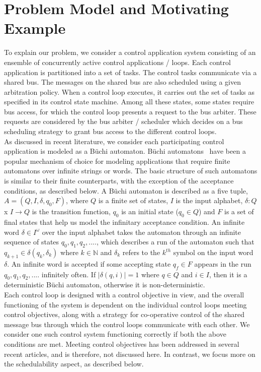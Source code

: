 \section{Problem Model and Motivating Example} \label{sec3}
\noindent
To explain our problem, we consider a control application system consisting of an ensemble of concurrently active control applications / loops. Each control application is partitioned into a set of
tasks. The control tasks communicate via a shared bus. The messages on the shared bus are also scheduled using a given arbitration policy. When a control loop executes, it carries out the set of tasks as specified in its control state machine. Among all these states, some
states require bus access, for which the control loop presents a request to the bus arbiter. These requests are considered by the bus arbiter / scheduler which decides on a bus scheduling strategy to grant bus access to the different control loops. \\

\noindent
As discussed in recent literature, we consider each participating control application is modeled as a B\"{u}chi automaton. B\"{u}chi automatons~\cite{leeuwen90/Thomas90} have been a popular mechanism of choice for modeling applications that require finite automatons over infinite strings or words. The basic structure of such automatons is similar to their finite counterparts, with the exception of the acceptance conditions, as described below.
A B\"{u}chi automaton is described as a five tuple, 
$A = (Q,I,\delta,q_0,F)$, where $Q$ is a finite set of states, $I$ is the input alphabet, $\delta : Q$ x $I \rightarrow Q $ is the transition function, $q_0$ 
is an initial state ($q_0 \in Q$) and $F$ is a set of final states that help us model the infinitary acceptance condition. An infinite word $\delta \in I ^ \omega$ over the input alphabet takes the automaton through an infinite sequence of states $ q_0, q_1, q_2, ....$, which describes a run of
the automaton such that $ q_{k+1} \in \delta(q_k, \delta_k)$ where $k \in \mathbb{N}$ and $\delta_k$ refers to the $k^{th}$ symbol on the input 
word $\delta$. An infinite word is accepted if some 
accepting state $q_f \in F $ appears in the run $ q_0, q_1, q_2, ....$ 
infinitely often. If 
$|\delta(q,i)| = 1$ where $ q \in Q $ and $i \in I$, then it is a deterministic 
B\"{u}chi automaton, otherwise it is non-deterministic. \\

\noindent
Each control loop is designed with a control objective in view, and the overall functioning of the system is dependent on the individual control loops meeting control objectives, along with a strategy for co-operative control of the shared message bus through which the control loops communicate with each other. We consider one such control system functioning correctly if both the above conditions are met. Meeting control objectives has been addressed in several recent articles, and is therefore, not discussed here. In contrast, we focus more on the schedulability aspect, as described below. 


